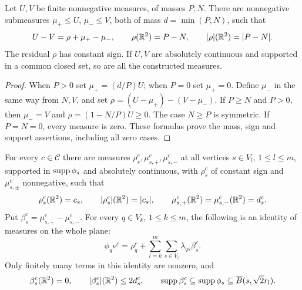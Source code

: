 \begin{lemma}\label{lem:prices-remove}
Let $U,V$ be finite nonnegative measures, of masses $P,N$.
There are nonnegative submeasures $\mu_+\le U$, $\mu_-\le V$,
both of mass $d=\min(P,N)$, such that
\[
 U-V=\rho+\mu_+-\mu_-,\qquad
 \rho(\mathbb R^2)=P-N,\qquad |\rho|(\mathbb R^2)=|P-N|.
\]
The residual $\rho$ has constant sign. If $U,V$ are absolutely
continuous and supported in a common closed set, so are all the
constructed measures.
\end{lemma}
\begin{proof}
When $P>0$ set $\mu_+=(d/P)U$; when $P=0$ set $\mu_+=0$.
Define $\mu_-$ in the same way from $N,V$, and set
$\rho=(U-\mu_+)-(V-\mu_-)$. If $P\ge N$ and $P>0$, then
$\mu_-=V$ and $\rho=(1-N/P)U\ge0$. The case $N\ge P$ is
symmetric. If $P=N=0$, every measure is zero. These formulas
prove the mass, sign and support assertions, including all zero
cases.
\end{proof}

\begin{lemma}\label{lem:prices-scalar-pairing}
For every $c\in\mathcal C$ there are measures
$\rho_s^c,\mu_{s,+}^c,\mu_{s,-}^c$ at all vertices
$s\in V_l$, $1\le l\le m$, supported in $\operatorname{supp}\phi_s$ and
absolutely continuous, with $\rho_s^c$ of constant sign and
$\mu_{s,\pm}^c$ nonnegative, such that
\begin{equation}\label{eq:prices-scalar-masses}
 \rho_s^c(\mathbb R^2)=c_s,\qquad |\rho_s^c|(\mathbb R^2)=|c_s|,
 \qquad
 \mu_{s,+}^c(\mathbb R^2)=\mu_{s,-}^c(\mathbb R^2)=d_s^c.
\end{equation}
Put $\beta_s^c=\mu_{s,+}^c-\mu_{s,-}^c$. For every
$q\in V_k$, $1\le k\le m$, the following is an identity of
measures on the whole plane:
\begin{equation}\label{eq:prices-vertex-reconstruction}
 \phi_q\nu^c=\rho_q^c+
       \sum_{l=k}^m\sum_{s\in V_l}\lambda_{qs}\beta_s^c.
\end{equation}
Only finitely many terms in this identity are nonzero, and
\begin{equation}\label{eq:prices-pair-properties}
 \beta_s^c(\mathbb R^2)=0,\qquad
 |\beta_s^c|(\mathbb R^2)\le2d_s^c,\qquad
 \operatorname{supp}\beta_s^c\subseteq\operatorname{supp}\phi_s
       \subseteq\overline B(s,\sqrt2 r_l).
\end{equation}
\end{lemma}

